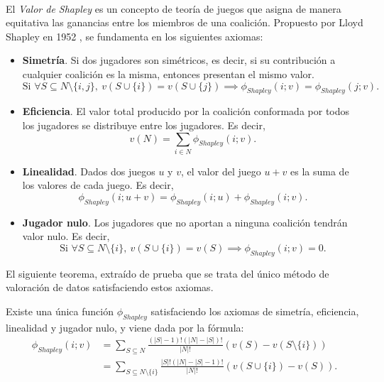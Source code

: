 \

El \emph{Valor de Shapley} es un concepto de teoría de juegos
que asigna de manera equitativa las ganancias
entre los miembros de una coalición. Propuesto
por Lloyd Shapley en 1952 \cite{shapleyValue},
se fundamenta en los siguientes axiomas:

\begin{itemize}
  \item \textbf{Simetría}. Si dos jugadores son simétricos, es decir,
  si su contribución a cualquier coalición es la misma,
  entonces presentan el mismo valor.
  $$
  \text{Si } \forall S \subseteq N \setminus \{i, j\},\ 
  v(S \cup \{i\}) = v(S \cup \{j\}) \implies \phi_{Shapley}(i;v) =
  \phi_{Shapley}(j;v).
  $$

  \item \textbf{Eficiencia}. El valor total producido por la coalición
  conformada por todos los jugadores se distribuye entre los
  jugadores. Es decir,
  $$
  v(N)=\sum_{i\in N}\phi_{Shapley}(i;v).
  $$

  \item \textbf{Linealidad}. Dados dos juegos $u$ y $v$, el valor del
  juego $u+v$ es la suma de los valores de cada juego. Es decir,
  $$
  \phi_{Shapley}(i;u+v)=\phi_{Shapley}(i;u)+\phi_{Shapley}(i;v).
  $$

  \item \textbf{Jugador nulo}. Los jugadores que no aportan a ninguna
  coalición tendrán valor nulo. Es decir,
  $$
  \text{Si } \forall S \subseteq N \setminus \{i\},\ 
  v(S \cup \{i\}) = v(S) \implies \phi_{Shapley}(i;v) = 0.
  $$
\end{itemize}

El siguiente teorema, extraído de \cite{shapleyValue} prueba
que se trata del único método de valoración de datos satisfaciendo
estos axiomas.

\begin{theorem}
  Existe una única función $\phi_{Shapley}$ satisfaciendo los axiomas
  de simetría, eficiencia, linealidad y jugador nulo, y viene
  dada por la fórmula:
  \begin{align*}
    \phi_{Shapley}(i;v)&=\sum_{S\subseteq N}
    \frac{(|S|-1)!(|N|-|S|)!}{|N|!}(v(S)-v(S \setminus \{i\}))\\
    &= \sum_{S\subseteq N \setminus \{i\}} \frac{|S|!(|N|-|S|-1)!}
    {|N|!}(v(S\cup \{i\})-v(S)).
  \end{align*}
  
\end{theorem}

